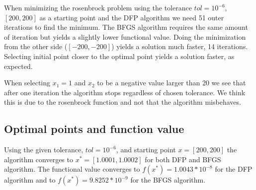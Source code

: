When minimizing the rosenbrock problem using the tolerance $tol=10^{-6}$, $[200,200]$ as a starting point and the DFP algorithm we need 51 outer iterations to find the minimum. The BFGS algorithm requires the same amount of iteration but yields a slightly lower functional value. Doing the minimization from the other side ($[-200,-200]$) yields a solution much faster, 14 iterations. Selecting initial point closer to the optimal point yields a solution faster, as expected. 

When selecting $x_1=1$ and $x_2$ to be a negative value larger than 20 we see that after one iteration the algorithm stops regardless of chosen tolerance. We think this is due to the rosenbrock function and not that the algorithm misbehaves.

\subsection{Optimal points and function value}
Using the given tolerance, $tol = 10^{-6}$, and starting point $x = [200,200]$ the algorithm converges to $x^*=[1.0001,1.0002]$ for both DFP and BFGS algorithm. The functional value converges to $f(x^*)=1.0043*10^{-8}$ for the DFP algorithm and to $f(x^*)=9.8252*10^{-9}$ for the BFGS algorithm. 